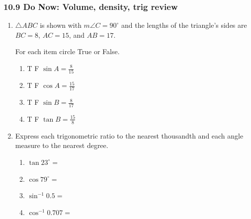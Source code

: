 \documentclass[12pt, twoside]{article}
\begin{document}
\subsubsection*{10.9 Do Now: Volume, density, trig review}
 \begin{enumerate}

   \item $\triangle ABC$ is shown with $m\angle C=90^\circ$ and the lengths of the triangle's sides are $BC=8$, $AC=15$, and $AB=17$.
      \begin{center}
       \end{center}
        For each item circle True or False.
        \begin{multicols}{2}
         \begin{enumerate}
         \item \quad T \qquad F \qquad $\displaystyle \sin A = \frac{8}{15}$ \vspace{0.25cm}
         \item \quad T \qquad F \qquad $\displaystyle \cos A = \frac{15}{17}$
         \item \quad T \qquad F \qquad $\displaystyle \sin B = \frac{8}{17}$ \vspace{0.25cm}
         \item \quad T \qquad F \qquad $\displaystyle \tan B = \frac{15}{8}$
       \end{enumerate}
     \end{multicols}
  \vspace{1.25cm}

  \item Express each trigonometric ratio to the nearest thousandth and each angle measure to the nearest degree.
    \begin{multicols}{2}
      \begin{enumerate}
        \item $\tan 23^\circ =$ \vspace{0.5cm}
        \item $\cos 79^\circ =$
        \item $\sin^{-1} 0.5 =$ \vspace{0.5cm}
        \item $\cos^{-1} 0.707 =$
      \end{enumerate}
    \end{multicols} \vspace{1.25cm}


\end{enumerate}
\end{document}
